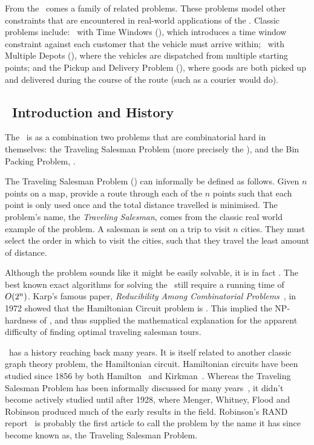 From the \VRP\ comes a family of related problems. These problems model other constraints that are encountered in real-world applications of the \VRP. Classic problems include: \VRP\ with Time Windows (\VRPTW), which introduces a time window constraint against each customer that the vehicle must arrive within; \VRP\ with Multiple Depots (\MDVRP), where the vehicles are dispatched from multiple starting points; and the Pickup and Delivery Problem (\PDP), where goods are both picked up and delivered during the course of the route (such as a courier would do).

\subsection{\TSP\ Introduction and History}
\label{sec:tiah}

The \VRP\ is as a combination two problems that are combinatorial hard in themselves: the Traveling Salesman Problem (more precisely the \MTSP), and the Bin Packing Problem, \BPP.

The Traveling Salesman Problem (\TSP) can informally be defined as follows. Given $n$ points on a map, provide a route through each of the $n$ points such that each point is only used once and the total distance travelled is minimised. The problem's name, the \emph{Traveling Salesman}, comes from the classic real world example of the problem. A salesman is sent on a trip to visit $n$ cities. They must select the order in which to visit the cities, such that they travel the least amount of distance.

Although the problem sounds like it might be easily solvable, it is in fact \nphard. The best known exact algorithms for solving the \TSP\ still require a running time of $\mbox{$O(2^n)$}$. Karp's famous paper, \emph{Reducibility Among Combinatorial Problems}~\cite{Kar72}, in 1972 showed that the Hamiltonian Circuit problem is \npcomplete. This implied the NP-hardness of \TSP, and thus supplied the mathematical explanation for the apparent difficulty of finding optimal traveling salesman tours. 


\TSP\ has a history reaching back many years. It is itself related to another classic graph theory problem, the Hamiltonian circuit. Hamiltonian circuits have been studied since 1856 by both Hamilton~\cite{Hamilton:1856} and Kirkman~\cite{Kirkman:1856}. Whereas the Traveling Salesman Problem has been informally discussed for many years~\cite{Schrijver}, it didn't become actively studied until after 1928, where Menger, Whitney, Flood and Robinson produced much of the early results in the field. Robinson's RAND report~\cite{Robinson:1949} is probably the first article to call the problem by the name it has since become known as, the Traveling Salesman Problem. 

